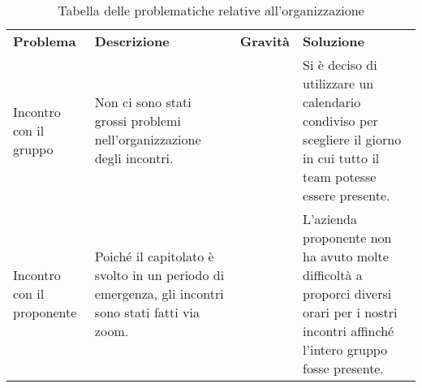 \renewcommand{\arraystretch}{1.5}
\begin{longtable}{  >{\centering}p{} >{}p{}
    >{\centering}p{} >{}p{}}
    \caption{Tabella delle problematiche relative all'organizzazione}\\
    \rowcolor{\primaryColor}
    \textcolor{\secondaryColor}{
    \centering\textbf{Problema}}     & \textcolor{\secondaryColor}{\centering\textbf{Descrizione}}    & \textcolor{\secondaryColor}
    {\centering\textbf{Gravità}} & \textcolor{\secondaryColor}{\centering\textbf{Soluzione}}\\
   
    Incontro con il gruppo  
    & Non ci sono stati grossi problemi nell’organizzazione degli incontri. 
    & 1  
    & Si è deciso di utilizzare un
    calendario condiviso per scegliere il giorno in cui tutto il
    team potesse essere presente.{} \\
    Incontro con il proponente
    & Poiché il capitolato è svolto in un periodo di emergenza, 
    gli incontri sono stati fatti via zoom. 
    & 1
    & L’azienda proponente non ha avuto molte difficoltà a proporci 
    diversi orari per i nostri incontri affinché l’intero gruppo fosse presente.{} \\
    \end{longtable}
